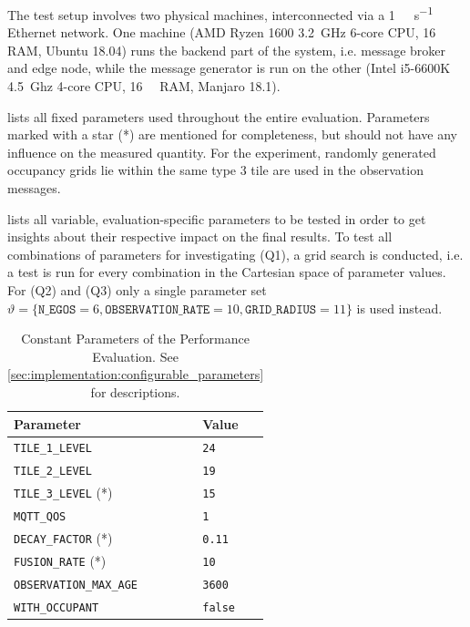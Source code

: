The test setup involves two physical machines, interconnected via a \SI{1}{\giga\bit\per\second} Ethernet network. One machine (AMD Ryzen 1600 \SI{3.2}{\giga\hertz} 6-core CPU, \SI{16}{\giga\byte} RAM, Ubuntu 18.04) runs the backend part of the system, i.e. message broker and edge node, while the message generator is run on the other (Intel i5-6600K \SI{4.5}{Ghz} 4-core CPU, \SI{16}{\giga\byte} RAM, Manjaro 18.1).
\par
\bigskip

 lists all fixed parameters used throughout the entire evaluation. Parameters marked with a star (*) are mentioned for completeness, but should not have any influence on the measured quantity. For the experiment, randomly generated occupancy grids lie within the same type 3 tile are used in the observation messages.

 lists all variable, evaluation-specific parameters to be tested in order to get insights about their respective impact on the final results. To test all combinations of parameters for investigating (Q1), a grid search is conducted, i.e. a test is run for every combination in the Cartesian space of parameter values. For (Q2) and (Q3) only a single parameter set $\vartheta = \{ \texttt{N\_EGOS} = 6, \texttt{OBSERVATION\_RATE} = 10, \texttt{GRID\_RADIUS} = 11 \}$ is used instead.

\begin{table}
	\centering
	\begin{tabular}{|p{4.5cm}|p{2cm}|}
		\hline 
		\textbf{Parameter} & \textbf{Value} \\ \hline 
		\texttt{TILE\_1\_LEVEL} & \texttt{24} \\ \hline 
		\texttt{TILE\_2\_LEVEL} & \texttt{19} \\ \hline 
		\texttt{TILE\_3\_LEVEL} (*) & \texttt{15} \\ \hline 
		\texttt{MQTT\_QOS} & \texttt{1} \\ \hline 
		\texttt{DECAY\_FACTOR} (*) & \texttt{0.11} \\ \hline 
		\texttt{FUSION\_RATE} (*) & \texttt{10} \\ \hline 
		\texttt{OBSERVATION\_MAX\_AGE} & \texttt{3600} \\ \hline 
		\texttt{WITH\_OCCUPANT} & \texttt{false} \\ \hline 
	\end{tabular}
	\caption[Constant Parameters of the Performance Evaluation]{Constant Parameters of the Performance Evaluation. See \cref{sec:implementation:configurable_parameters} for descriptions.}
	\label{tab:performance_evaluation:constant_parameters}
\end{table}

